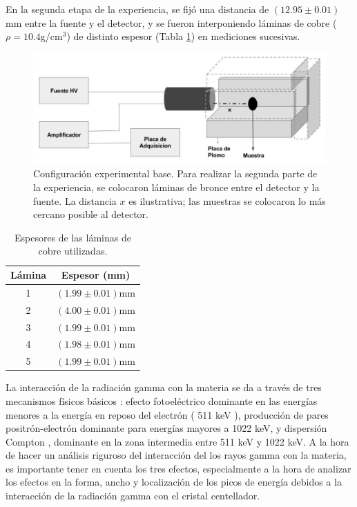\documentclass[twoside]{article}
\begin{document}
\begin{multicols}{2}
En la segunda etapa de la experiencia, se fijó una distancia de $(12.95 \pm 0.01)$mm entre la fuente y el detector, y se fueron interponiendo láminas de cobre ($\rho = 10.4$g/cm$^3$) de distinto espesor (Tabla \ref{espesores}) en mediciones sucesivas.


\begin{figure}[H]
    \centering
    \includegraphics[scale=0.15]{ExpeNu.png}
    \caption{Configuración experimental base. Para realizar la segunda parte de la experiencia, se colocaron láminas de bronce entre el detector y la fuente. La distancia $x$ es ilustrativa; las muestras se colocaron lo más cercano posible al detector.}
    \label{experimental}
\end{figure}

\begin{table}[H]
    \centering
    \begin{tabular}{c|c}
         \hline
         Lámina & Espesor (mm) \\
         \hline 
         1 &  $(1.99 \pm 0.01)$mm\\\hline
         2 & $(4.00 \pm 0.01)$mm \\ \hline
         3 & $(1.99 \pm 0.01)$mm \\ \hline
         4 & $(1.98 \pm 0.01)$mm \\ \hline
         5 & $(1.99 \pm 0.01)$mm \\ \hline
         
    \end{tabular}
    \caption{Espesores de las láminas de cobre utilizadas.}
    \label{espesores}
\end{table}


\iffalse
La interacción de la radiación gamma con la materia se da a través de tres mecanismos físicos básicos : efecto fotoeléctrico dominante en las energías menores a la energía en reposo del electrón ( 511 keV ), producción de pares positrón-electrón dominante para energías mayores a 1022 keV, y dispersión Compton , dominante en la zona intermedia entre 511 keV y 1022 keV. A la hora de hacer un análisis riguroso del interacción del los rayos gamma con la materia, es importante tener en cuenta los tres efectos, especialmente a la hora de analizar los efectos en la forma, ancho y localización de los picos de energía debidos a la interacción de la radiación gamma con el cristal centellador.


\end{multicols}
\end{document}
